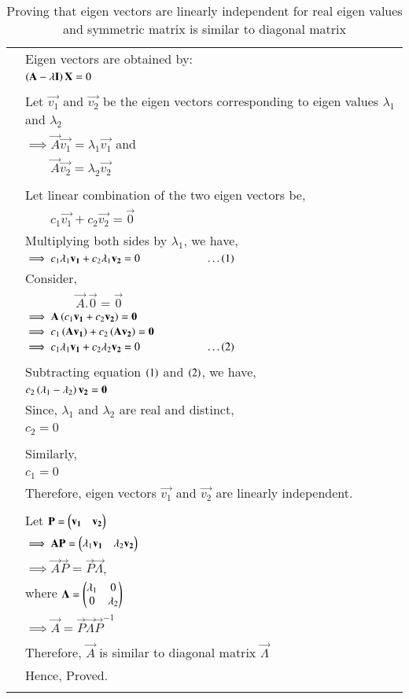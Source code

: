 \documentclass[journal,12pt]{IEEEtran}
\begin{document}
\begin{longtable}{|c|l|}
	& Eigen vectors are obtained by:\\
	& $\left(\mathbf{A}-\lambda \mathbf{I}\right)\mathbf{X}=0$\\
	&\\
	& Let $\vec{v_1}$ and $\vec{v_2}$ be the eigen vectors corresponding to eigen values $\lambda_1$ and $\lambda_2$\\
	& $\implies \vec{A}\vec{v_1}=\lambda_1\vec{v_1}$ and\\
	& $\qquad \vec{A}\vec{v_2}=\lambda_2\vec{v_2}$\\
	&\\
	& Let linear combination of the two eigen vectors be,\\
	& $\qquad c_1\vec{v_1}+c_2\vec{v_2}=\vec{0}$\\
	& Multiplying both sides by $\lambda_1$, we have,\\
	& $\implies c_1\lambda_1\mathbf{v_1}+c_2\lambda_1\mathbf{v_2}=0\qquad \qquad \qquad \dots \left(1\right)$\\
	& Consider,\\
	& $\qquad\qquad\vec{A}.\vec{0}=\vec{0}$\\
	& $\implies \mathbf{A}\left(c_1\mathbf{v_1}+c_2\mathbf{v_2}\right)=\mathbf{0}$\\
	& $\implies c_1\left(\mathbf{A}\mathbf{v_1}\right)+ c_2\left(\mathbf{A}\mathbf{v_2}\right)=\mathbf{0}$\\
	& $\implies c_1\lambda_1\mathbf{v_1}+c_2\lambda_2\mathbf{v_2}=0\qquad \qquad \qquad \dots \left(2\right)$\\
	&\\
	& Subtracting equation $\left(1\right)$ and $\left(2\right)$, we have,\\
	& $c_2\left(\lambda_1-\lambda_2\right)\mathbf{v_2}=\mathbf{0}$\\
	& Since, $\lambda_1$ and $\lambda_2$ are real and distinct,\\
	& $c_2=0$\\
	&\\
	& Similarly,\\
	& $c_1=0$\\
	& Therefore, eigen vectors $\vec{v_1}$ and $\vec{v_2}$ are linearly independent.\\
	&\\
	& Let $\mathbf{P}=\begin{pmatrix}\mathbf{v_1}& \mathbf{v_2}\end{pmatrix}$\\
	& $\implies \mathbf{A}\mathbf{P}=\begin{pmatrix}\lambda_1 \mathbf{v_1}&\lambda_2 \mathbf{v_2}\end{pmatrix}$\\
	& $\implies \vec{A}\vec{P}=\vec{P}\vec{\Lambda}$, \\
	& where $\mathbf{\Lambda}=\begin{pmatrix}\lambda_1&0\\0&\lambda_2\end{pmatrix}$\\
	& $\implies \vec{A}=\vec{P}\vec{\Lambda} \vec{P}^{-1}$\\
	&\\
	& Therefore, $\vec{A}$ is similar to diagonal matrix $\vec{\Lambda}$\\
	& Hence, Proved.\\
	\hline
	\caption{Proving that eigen vectors are linearly independent for real eigen values and symmetric matrix is similar to diagonal matrix}
    \label{table:2}
\end{longtable}
\end{document}
